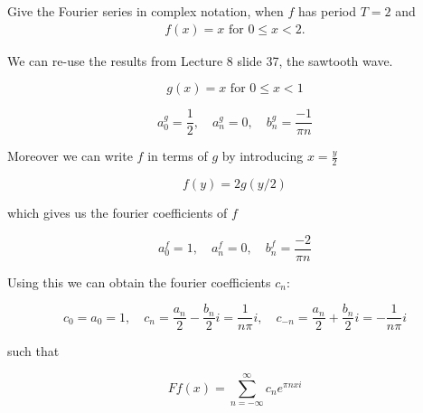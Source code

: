 \documentclass[11pt]{article}
\begin{document}
\begin{exercise}
    Give the Fourier series in complex notation, when $f$ has period $T = 2$ and 
    \begin{gather*}
        f(x) = x \text{ for } 0 \leq x < 2.
    \end{gather*}
\end{exercise}
\begin{solution}     
We can re-use the results from Lecture 8 slide 37, the sawtooth wave.

\begin{equation*}
g(x)=x \text { for } 0 \leq x<1
\end{equation*}

\begin{equation*}
a_0^g = \frac{1}{2},\quad a_n^g = 0, \quad b_n^g = \frac{-1}{\pi n}
\end{equation*}

Moreover we can write $f$ in terms of $g$ by introducing $x = \frac{y}{2}$

$$
f(y) = 2g(y/2)
$$

which gives us the fourier coefficients of $f$

\begin{equation*}
a_0^f = 1,\quad a_n^f = 0, \quad b_n^f = \frac{-2}{\pi n}
\end{equation*}

Using this we can obtain the fourier coefficients $c_n$:

$$
c_0 = a_0 = 1,\quad c_n=\frac{a_n}{2}-\frac{b_n}{2} i = \frac{1}{n\pi}i, \quad c_{-n}=\frac{a_n}{2}+\frac{b_n}{2} i = -\frac{1}{n\pi}i
$$

such that 

$$
F f(x)=\sum_{n=-\infty}^{\infty} c_n e^{\pi n x i}
$$
\end{solution}
\end{document}
